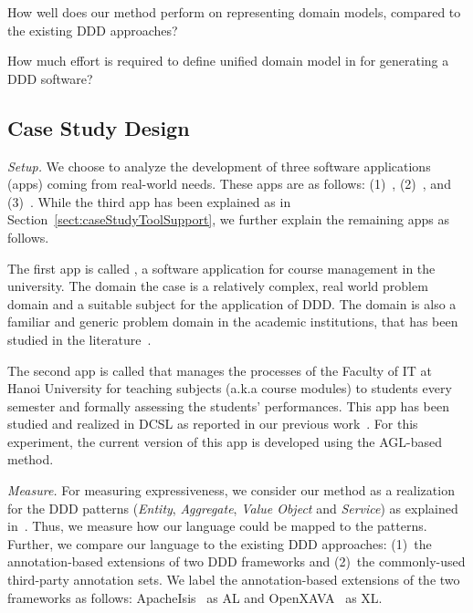\begin{description}[labelindent=0.5cm,leftmargin=0.5cm]
%
\item[\textbf{RQ1.}] How well does our method perform on representing domain models, compared to the existing DDD approaches?
%
\item[\textbf{RQ2.}] How much effort is required to define unified domain model in \agldcsl for generating a DDD software?
%
%
\end{description}
 
\subsection{Case Study Design}
\label{subsect:caseDesign} 

\noindent \textit{Setup.} We choose to analyze the development of three software applications (apps) coming from real-world needs. These apps are as follows: (1)~\courseman, (2)~\processman, and (3)~\orderman. While the third app has been explained as in Section~\ref{sect:caseStudyToolSupport}, we further explain the remaining apps as follows.	

The first app is called \courseman, a software application for course management in the university. The domain \wrt the case is a relatively complex, real world problem domain and a suitable subject for the application of DDD. The domain is also a familiar and generic problem domain in the academic institutions, that has been studied in the literature~\cite{le_domain_2018,ajanovski2013integration,o2007recommender}.

The second app is called \processman that manages the processes of the Faculty of IT at Hanoi University for teaching subjects (a.k.a course modules) to students every semester and formally assessing the students’ performances. This app has been studied and realized in DCSL as reported in our previous work~\cite{le_generative_2018}. For this experiment, the current version of this app is developed using the AGL-based method.


\vspace{0.1cm}
\noindent\textit{Measure.} For measuring expressiveness, we consider our method as a realization for the DDD patterns (\textit{Entity}, \textit{Aggregate}, \textit{Value Object} and \textit{Service}) as explained in~\cite{evans_domain-driven_2004}. Thus, we measure how our language could be mapped to the patterns. Further, we compare our language to the existing DDD approaches: (1)~the annotation-based extensions of two DDD frameworks and (2)~the commonly-used third-party annotation sets. We label the annotation-based extensions of the two frameworks as follows: ApacheIsis~\cite{apache-s.f_apache_2016} as AL and OpenXAVA~\cite{noauthor_openxava_2016} as XL. 

